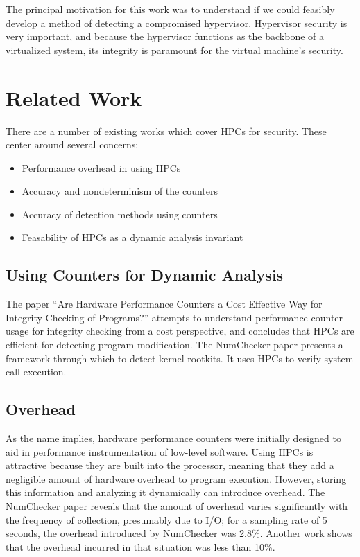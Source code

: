 \documentclass[notitlepage]{article}
\begin{document}
The principal motivation for this work was to understand if we could feasibly
develop a method of detecting a compromised hypervisor. Hypervisor security is
very important, and because the hypervisor functions as the backbone of a
virtualized system, its integrity is paramount for the virtual machine's
security.



\section{Related Work}
\label{sec:related}
There are a number of existing works which cover HPCs for security. These center
around several concerns:
\begin{itemize}
    \item Performance overhead in using HPCs
    \item Accuracy and nondeterminism of the counters
    \item Accuracy of detection methods using counters
    \item Feasability of HPCs as a dynamic analysis invariant
\end{itemize}

\subsection{Using Counters for Dynamic Analysis}
The paper ``Are Hardware Performance Counters a Cost Effective Way for Integrity
Checking of Programs?'' attempts to understand performance counter usage for
integrity checking from a cost perspective, and concludes that HPCs are
efficient for detecting program modification\cite{arehardware}. The
NumChecker\cite{numchecker} paper presents a framework through which to detect
kernel rootkits. It uses HPCs to verify system call execution.

\subsection{Overhead}
As the name implies, hardware performance counters were initially designed to
aid in performance instrumentation of low-level software. Using HPCs is
attractive because they are built into the processor, meaning that they add a
negligible amount of hardware overhead to program execution. However, storing
this information and analyzing it dynamically can introduce overhead. The
NumChecker\cite{numchecker} paper reveals that the amount of overhead varies
significantly with the frequency of collection,  presumably due to I/O; for a
sampling rate of 5 seconds, the overhead introduced by NumChecker was
2.8\%\cite{numchecker}. Another work shows that the overhead incurred in that
situation was less than 10\%\cite{arehardware}.
\end{document}
